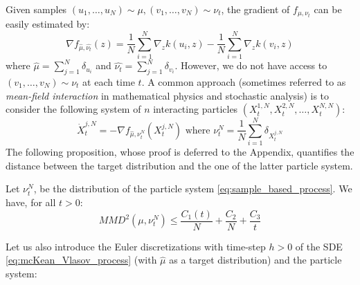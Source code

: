  Given samples $(u_1, \dots, u_N)\sim \mu, (v_1, \dots, v_N)\sim \nu_t$, the gradient of $f_{\mu, \nu_t}$ can be easily estimated by:
\begin{equation}
\nabla f_{\widehat{\mu},\widehat{\nu_t}}(z)= \frac{1}{N}\sum_{i=1}^{N}\nabla_{z}k(u_i,z) -\frac{1}{N}\sum_{i=1}^{N}\nabla_{z}k(v_i,z) 
\end{equation}
where $\widehat{ \mu}=\sum_{j=1}^{N}\delta_{u_i}$ and $\widehat{ \nu_t}=\sum_{j=1}^{N}\delta_{v_i}$. However, we do not have access to $(v_1, \dots, v_N)\sim \nu_t$ at each time $t$. A common approach (sometimes referred to as \textit{mean-field interaction} in mathematical physics and stochastic analysis) is to consider the following system of $n$ interacting particles $(X_t^{1,N}, X_t^{2,N}, \dots, X_t^{N,N})$: 
\begin{equation}\label{eq:sample_based_process}
\dot{X}_t^{j,N}=-\nabla f_{\widehat{\mu}, \nu_t^N}(X_t^{j,N}) \text{ where } \nu_t^N=\frac{1}{N} \sum_{i=1}^N \delta_{X_t^{j,N}}
\end{equation}
The following proposition, whose proof is deferred to the Appendix, quantifies the distance between the target distribution and the one of the latter particle system.
\begin{proposition}\label{prop:sample_based_rates}
	 Let $\nu_t^N$, be the distribution of the particle system \eqref{eq:sample_based_process}. We have, for all $t>0$:
	\begin{equation}
	MMD^2(\mu,\nu_t^N)\le \frac{C_1(t)}{N}+ \frac{C_2}{N} + \frac{C_3}{t}
	\end{equation}
\end{proposition}
Let us also introduce the Euler discretizations with time-step $h > 0$ of the SDE \eqref{eq:mcKean_Vlasov_process} (with $\widehat{ \mu}$ as a target distribution) and the particle system:
